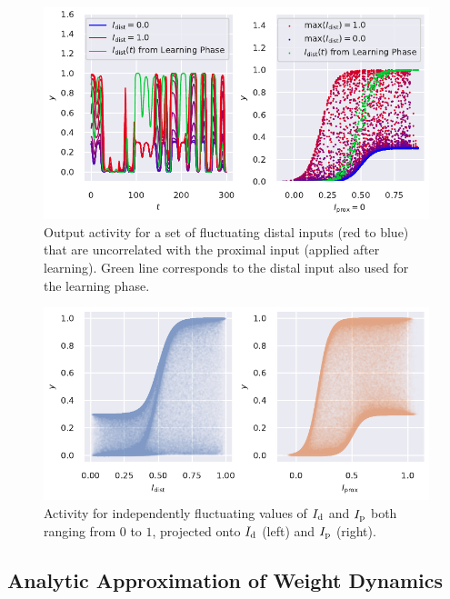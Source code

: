 \documentclass[10pt,a4paper]{article}
\begin{document}
\begin{figure}
	\centering
	\includegraphics[width=\textwidth]{./figures/output_modulation_sweep_decorr_input.pdf}
	\caption{Output activity for a set of fluctuating distal inputs (red to blue) that are uncorrelated with the proximal input (applied after learning). Green line corresponds to the distal input also used for the learning phase.}
	\label{fig:altern_dist_sweep_mod}
\end{figure}

\begin{figure}
	\centering
	\includegraphics[width=\textwidth]{./figures/output_modulation_max_distal.pdf}
	\caption{Activity for independently fluctuating values of $I_{\rm d}$ and $I_{\rm p}$ both ranging from $0$ to $1$, projected onto $I_{\rm d}$ (left) and $I_{\rm p}$ (right).}
	\label{fig:output_mod_project}
\end{figure}

\subsection{Analytic Approximation of Weight Dynamics}
\end{document}
